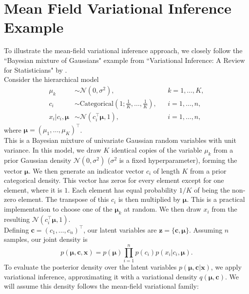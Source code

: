 \documentclass[honours,12pt, twoside]{unswthesis}
\numberwithin{equation}{section}
\theoremstyle{definition}
\begin{document}
\chapter{Mean Field Variational Inference Example}\label{app:C}
To illustrate the mean-field variational inference approach, we closely follow the ``Bayesian mixture of Gaussians" example from ``Variational Inference: A Review for Statisticians" by \citet{blei}.\\
Consider the hierarchical model
\begin{align*}
\mu_k&\sim \mathcal{N}(0,\sigma^2), &&k=1,\dots,K,\\
c_i&\sim \text{Categorical}\left(1;\frac{1}{K},\dots,\frac{1}{K}\right), &&i=1,\dots,n,\\
x_i|c_i,\bm{\mu}&\sim \mathcal{N}(c^\top_i\bm{\mu},1), &&i=1,\dots,n,
\end{align*}
where $\bm{\mu}=(\mu_1,\dots,\mu_K)^\top$.\\
This is a Bayesian mixture of univariate Gaussian random variables with unit variance. In this model, we draw $K$ identical copies of the variable $\mu_k$ from a prior Gaussian density $\mathcal{N}(0,\sigma^2)$ ($\sigma^2$ is a fixed hyperparameter), forming the vector $\bm{\mu}$. We then generate an indicator vector $c_i$ of length $K$ from a prior categorical density. This vector has zeros for every element except for one element, where it is $1$. Each element has equal probability $1/K$ of being the non-zero element. The transpose of this $c_i$ is then multiplied by $\bm{\mu}$. This is a practical implementation to choose one of the $\bm{\mu}_k$ at random. We then draw $x_i$ from the resulting $\mathcal{N}(c^\top_i\bm{\mu},1)$.\\
Defining $\bm{c}=(c_1,\dots,c_n)^\top$, our latent variables are $\bm{z}=\{\bm{c},\bm{\mu}\}$. Assuming $n$ samples, our joint density is
\begin{equation}
p(\bm{\mu},\bm{c},\bm{x})=p(\bm{\mu})\prod^n_{i=1}p(c_i)p(x_i|c_i, \bm{\mu}).\end{equation}
To evaluate the posterior density over the latent variables $p(\bm{\mu},\bm{c}|\bm{x})$, we apply variational inference, approximating it with a variational density $q(\bm{\mu},\bm{c})$. We will assume this density follows the mean-field variational family:
\end{document}
